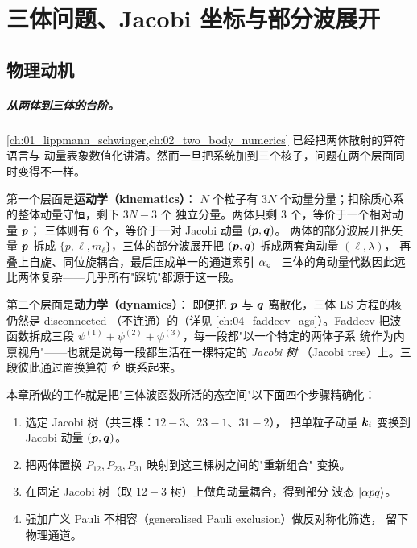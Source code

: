 
\chapter{三体问题、Jacobi 坐标与部分波展开}
\label{ch:03_jacobi_partial_wave}

\section{物理动机}
\label{sec:ch03-motivation}

\paragraph{从两体到三体的台阶。}
\cref{ch:01_lippmann_schwinger,ch:02_two_body_numerics} 已经把两体散射的算符语言与
动量表象数值化讲清。然而一旦把系统加到三个核子，问题在两个层面同时变得不一样。

第一个层面是\textbf{运动学（kinematics）}：
\(N\) 个粒子有 \(3N\) 个动量分量；扣除质心系的整体动量守恒，剩下 \(3N-3\) 个
独立分量。两体只剩 3 个，等价于一个相对动量 \(\bm{p}\)；
三体则有 6 个，等价于一对 Jacobi 动量 \((\bm{p}, \bm{q})\)。
两体的部分波展开把矢量 \(\bm{p}\) 拆成
\(\{p, \ell, m_\ell\}\)，三体的部分波展开把
\((\bm{p}, \bm{q})\) 拆成两套角动量 \((\ell, \lambda)\)，
再叠上自旋、同位旋耦合，最后压成单一的通道索引 \(\alpha\)。
三体的角动量代数因此远比两体复杂——几乎所有"踩坑"都源于这一段。

第二个层面是\textbf{动力学（dynamics）}：
即便把 \(\bm{p}\) 与 \(\bm{q}\) 离散化，三体 LS 方程的核仍然是 disconnected
（不连通）的（详见 \cref{ch:04_faddeev_ags}）。Faddeev 把波函数拆成三段
\(\psi^{(1)} + \psi^{(2)} + \psi^{(3)}\)，每一段都"以一个特定的两体子系
统作为内禀视角"——也就是说每一段都生活在一棵特定的 \emph{Jacobi 树}
（Jacobi tree）上。三段彼此通过置换算符 \(\hat{\mathcal{P}}\) 联系起来。

本章所做的工作就是把"三体波函数所活的态空间"以下面四个步骤精确化：
\begin{enumerate}
  \item 选定 Jacobi 树（共三棵：\(12\!-\!3\)、\(23\!-\!1\)、\(31\!-\!2\)），
        把单粒子动量 \(\bm{k}_i\) 变换到 Jacobi 动量 \((\bm{p},\bm{q})\)。
  \item 把两体置换 \(P_{12}, P_{23}, P_{31}\) 映射到这三棵树之间的"重新组合"
        变换。
  \item 在固定 Jacobi 树（取 \(12\!-\!3\) 树）上做角动量耦合，得到部分
        波态 \(\ket{\alpha p q}\)。
  \item 强加广义 Pauli 不相容（generalised Pauli exclusion）做反对称化筛选，
        留下物理通道。
\end{enumerate}

